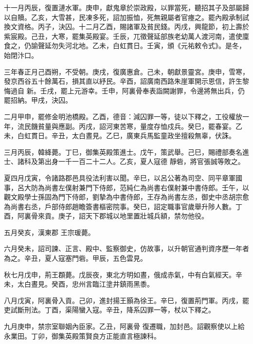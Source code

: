 \begin{pinyinscope}
 十一月丙辰，復置漣水軍。庚申，獻鬼章於崇政殿，以罪當死，聽招其子及部屬歸以自贖。乙亥，大雪甚，民凍多死，詔加振恤，死無親屬者官瘞之。罷內殿承制試
 換文資格。丙子，決囚。十二月乙酉，賜諸軍及貧民錢。丙戌，興龍節，初上壽於紫宸殿。己丑，大寒，罷集英殿宴。壬辰，兀徵聲延部族老幼萬人渡河南，遣使廩食之，仍諭聲延勿失河北地。乙未，白虹貫日。壬寅，頒《元祐敕令式》。是冬，始閉汴口。



 三年春正月己酉朔，不受朝。庚戌，復廣惠倉。己未，朝獻景靈宮。庚申，雪寒，發京西谷五十餘萬石，損其直以紓民。辛酉，詔廣南西路朱崖軍開示恩信，許生黎悔過自
 新。壬戌，罷上元游幸。壬申，阿裏骨奉表詣闕謝罪，令邊將無出兵，仍罷招納。甲戌，決囚。



 二月甲申，罷修金明池橋殿。乙酉，德音：減囚罪一等，徒以下釋之，工役權放一年，流民饑貧量與應副。丙戌，詔河東苦寒，量度存恤戍兵。癸巳，罷春宴。乙未，白虹貫日。辛丑，太白晝見。乙巳，廣東兵馬監童政坐擅殺無辜，伏誅。



 三月丙辰，韓絳薨。丁巳，御集英殿策進士。戊午，策武舉。己巳，賜禮部奏名進士、諸科及第出身一千一百二十二人。乙亥，夏人寇德
 靜砦，將官張誠等敗之。



 夏四月戊寅，令諸路郡邑具役法利害以聞。辛巳，以呂公著為司空、同平章軍國事，呂大防為尚書左僕射兼門下侍郎，范純仁為尚書右僕射兼中書侍郎。壬午，以觀文殿學士孫固為門下侍郎，劉摯為中書侍郎，王存為尚書左丞，御史中丞胡宗愈為尚書右丞，戶部侍郎趙瞻簽書樞密院事。癸巳，詔定職事官歲舉升陟人數。丁酉，阿裏骨來貢。庚子，詔天下郡城以地里置壯城兵額，禁勿他役。



 五月癸亥，漢東郡
 王宗瑗薨。



 六月癸未，詔司諫、正言、殿中、監察御史，仿故事，以升朝官通判資序歷一年者為之。辛丑，夏人寇塞門砦。甲辰，五色雲見。



 秋七月戊申，荊王頵薨。戊辰夜，東北方明如晝，俄成赤氣，中有白氣經天。辛未，太白晝見。癸酉，忠州言臨江塗井鎮雨黑黍。



 八月戊寅，阿裏骨入貢。己卯，進封揚王顥為徐王。辛巳，復置荊門軍。丙戌，罷吏試斷刑法。丁酉，渠陽蠻入寇。辛丑，降系囚罪一等，杖以下釋之。



 九月庚申，禁宗室聯姻內臣家。乙丑，阿裏骨
 復遷職，加封邑。詔觀察使以上給永業田。丁卯，御集英殿策賢良方正能直言極諫科。




\end{pinyinscope}
